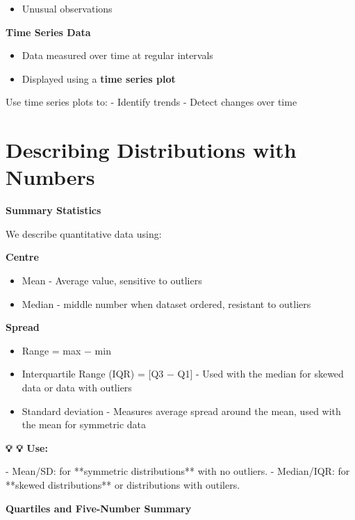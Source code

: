 \documentclass[
  11pt,
  oneside]{scrbook}
\providecommand{\tightlist}{%
  \setlength{\itemsep}{0pt}\setlength{\parskip}{0pt}}
\begin{document}
\begin{itemize}
\tightlist
\item
  Unusual observations
\end{itemize}

\textbf{Time Series Data}

\begin{itemize}
\tightlist
\item
  Data measured over time at regular intervals\\
\item
  Displayed using a \textbf{time series plot}
\end{itemize}

Use time series plots to:
- Identify trends
- Detect changes over time

\section{Describing Distributions with Numbers}\label{describing-distributions-with-numbers}

\textbf{Summary Statistics}

We describe quantitative data using:

\textbf{Centre}

\begin{itemize}
\item
  Mean - Average value, sensitive to outliers
\item
  Median - middle number when dataset ordered, resistant to outliers
\end{itemize}

\textbf{Spread}

\begin{itemize}
\item
  Range = max − min
\item
  Interquartile Range (IQR) = {[}Q3 − Q1{]} - Used with the median for skewed data or data with outliers
\item
  Standard deviation - Measures average spread around the mean, used with the mean for symmetric data
\end{itemize}

\begin{tipbox}
\textbf{💡 💡 Use:}

 - Mean/SD: for **symmetric distributions** with no outliers.
- Median/IQR: for **skewed distributions** or distributions with outilers.
\end{tipbox}

\textbf{Quartiles and Five-Number Summary}
\end{document}
